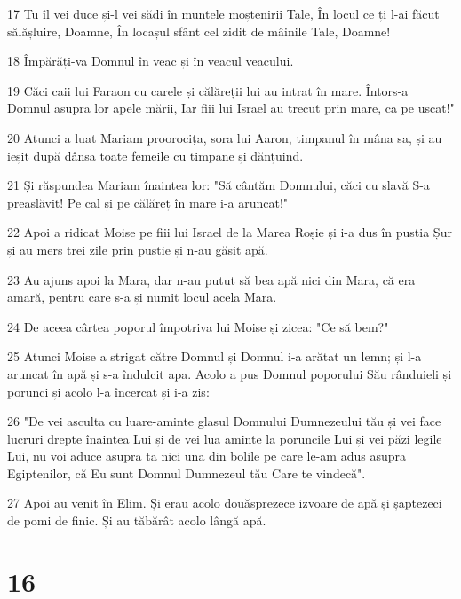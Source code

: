 \par 17 Tu îl vei duce și-l vei sădi în muntele moștenirii Tale, În locul ce ți l-ai făcut sălășluire, Doamne, În locașul sfânt cel zidit de mâinile Tale, Doamne!
\par 18 Împărăți-va Domnul în veac și în veacul veacului.
\par 19 Căci caii lui Faraon cu carele și călăreții lui au intrat în mare. Întors-a Domnul asupra lor apele mării, Iar fiii lui Israel au trecut prin mare, ca pe uscat!"
\par 20 Atunci a luat Mariam proorocița, sora lui Aaron, timpanul în mâna sa, și au ieșit după dânsa toate femeile cu timpane și dănțuind.
\par 21 Și răspundea Mariam înaintea lor: "Să cântăm Domnului, căci cu slavă S-a preaslăvit! Pe cal și pe călăreț în mare i-a aruncat!"
\par 22 Apoi a ridicat Moise pe fiii lui Israel de la Marea Roșie și i-a dus în pustia Șur și au mers trei zile prin pustie și n-au găsit apă.
\par 23 Au ajuns apoi la Mara, dar n-au putut să bea apă nici din Mara, că era amară, pentru care s-a și numit locul acela Mara.
\par 24 De aceea cârtea poporul împotriva lui Moise și zicea: "Ce să bem?"
\par 25 Atunci Moise a strigat către Domnul și Domnul i-a arătat un lemn; și l-a aruncat în apă și s-a îndulcit apa. Acolo a pus Domnul poporului Său rânduieli și porunci și acolo l-a încercat și i-a zis:
\par 26 "De vei asculta cu luare-aminte glasul Domnului Dumnezeului tău și vei face lucruri drepte înaintea Lui și de vei lua aminte la poruncile Lui și vei păzi legile Lui, nu voi aduce asupra ta nici una din bolile pe care le-am adus asupra Egiptenilor, că Eu sunt Domnul Dumnezeul tău Care te vindecă".
\par 27 Apoi au venit în Elim. Și erau acolo douăsprezece izvoare de apă și șaptezeci de pomi de finic. Și au tăbărât acolo lângă apă.

\chapter{16}

